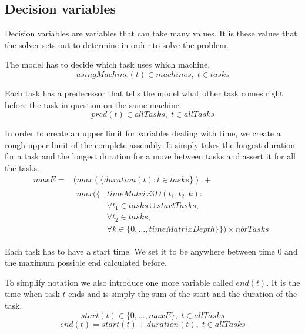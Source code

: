  
 \subsection{Decision variables}
 Decision variables are variables that can take many values. It is these values that the solver sets out to determine in order to solve the problem.

  \noindent The model has to decide which task uses which machine.
 \begin{equation}\label{eq:40}
 usingMachine(t) \in machines, \; t \in tasks
 \end{equation}

  \noindent Each task has a predecessor that tells the model what other task comes right before the task in question on the same machine.
 \begin{equation}\label{eq:41}
 pred(t) \in allTasks, \; t \in allTasks
 \end{equation}

  \noindent In order to create an upper limit for variables dealing with time, we create a rough upper limit of the complete assembly. It simply takes the longest duration for a task and the longest duration for a move between tasks and assert it for all the tasks.
 \begin{equation}
 \begin{aligned}\label{eq:maxE}
 maxE = &(max(\{duration(t) : t \in tasks\}) \; +  \\ 
 &\begin{aligned}
 max(\{&timeMatrix3D(t_1,t_2,k) : \\
 &\forall t_1 \in tasks \cup startTasks,  \\ 
 &\forall t_2 \in tasks,\\
 &\forall k \in \{0 , \ldots , timeMatrixDepth\}\}) \times nbrTasks
  \end{aligned}
 \end{aligned}
 \end{equation}

  \noindent Each task has to have a start time. We set it to be anywhere between time $0$ and the maximum possible end calculated before.
 
 To simplify notation we also introduce one more variable called $end(t)$. It is the time when task $t$ ends and is simply the sum of the start and the duration of the task.
 \begin{equation}\label{eq:46}
 start(t) \in \{0 , \ldots , maxE\}, \; t \in allTasks
 \end{equation} 
 \begin{equation}\label{eq:47}
 end(t) = start(t) + duration(t), \; t \in allTasks
 \end{equation}

